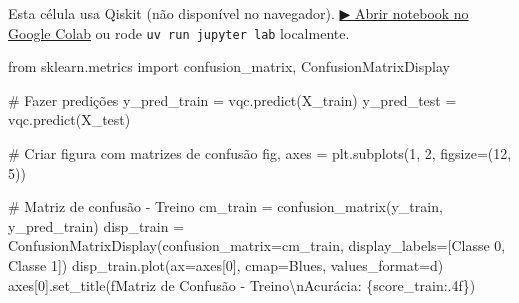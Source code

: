 \documentclass[
  brazilian,
]{report}
\newenvironment{Shaded}{\begin{snugshade}}{\end{snugshade}}
\newcommand{\CharTok}[1]{\textcolor[rgb]{0.13,0.47,0.30}{#1}}
\newcommand{\CommentTok}[1]{\textcolor[rgb]{0.37,0.37,0.37}{#1}}
\newcommand{\DecValTok}[1]{\textcolor[rgb]{0.68,0.00,0.00}{#1}}
\newcommand{\ImportTok}[1]{\textcolor[rgb]{0.00,0.46,0.62}{#1}}
\newcommand{\NormalTok}[1]{\textcolor[rgb]{0.00,0.23,0.31}{#1}}
\newcommand{\OperatorTok}[1]{\textcolor[rgb]{0.37,0.37,0.37}{#1}}
\newcommand{\SpecialCharTok}[1]{\textcolor[rgb]{0.37,0.37,0.37}{#1}}
\newcommand{\SpecialStringTok}[1]{\textcolor[rgb]{0.13,0.47,0.30}{#1}}
\newcommand{\StringTok}[1]{\textcolor[rgb]{0.13,0.47,0.30}{#1}}
\begin{document}
\begin{tcolorbox}[enhanced jigsaw, arc=.35mm, bottomrule=.15mm, bottomtitle=1mm, breakable, colback=white, colbacktitle=quarto-callout-warning-color!10!white, colframe=quarto-callout-warning-color-frame, coltitle=black, left=2mm, leftrule=.75mm, opacityback=0, opacitybacktitle=0.6, rightrule=.15mm, title=\textcolor{quarto-callout-warning-color}{\faExclamationTriangle}\hspace{0.5em}{⚛️ Célula Qiskit --- execute no Colab ou localmente}, titlerule=0mm, toprule=.15mm, toptitle=1mm]

Esta célula usa Qiskit (não disponível no navegador).
\href{https://colab.research.google.com/github/maxwellamaral/aula-quantum/blob/main/notebooks/20-quantum-machine-learning.ipynb}{▶
Abrir notebook no Google Colab} ou rode \texttt{uv\ run\ jupyter\ lab}
localmente.

\begin{Shaded}
\begin{Highlighting}[]

\ImportTok{from}\NormalTok{ sklearn.metrics }\ImportTok{import}\NormalTok{ confusion\_matrix, ConfusionMatrixDisplay}

\CommentTok{\# Fazer predições}
\NormalTok{y\_pred\_train }\OperatorTok{=}\NormalTok{ vqc.predict(X\_train)}
\NormalTok{y\_pred\_test }\OperatorTok{=}\NormalTok{ vqc.predict(X\_test)}

\CommentTok{\# Criar figura com matrizes de confusão}
\NormalTok{fig, axes }\OperatorTok{=}\NormalTok{ plt.subplots(}\DecValTok{1}\NormalTok{, }\DecValTok{2}\NormalTok{, figsize}\OperatorTok{=}\NormalTok{(}\DecValTok{12}\NormalTok{, }\DecValTok{5}\NormalTok{))}

\CommentTok{\# Matriz de confusão {-} Treino}
\NormalTok{cm\_train }\OperatorTok{=}\NormalTok{ confusion\_matrix(y\_train, y\_pred\_train)}
\NormalTok{disp\_train }\OperatorTok{=}\NormalTok{ ConfusionMatrixDisplay(confusion\_matrix}\OperatorTok{=}\NormalTok{cm\_train, display\_labels}\OperatorTok{=}\NormalTok{[}\StringTok{\textquotesingle{}Classe 0\textquotesingle{}}\NormalTok{, }\StringTok{\textquotesingle{}Classe 1\textquotesingle{}}\NormalTok{])}
\NormalTok{disp\_train.plot(ax}\OperatorTok{=}\NormalTok{axes[}\DecValTok{0}\NormalTok{], cmap}\OperatorTok{=}\StringTok{\textquotesingle{}Blues\textquotesingle{}}\NormalTok{, values\_format}\OperatorTok{=}\StringTok{\textquotesingle{}d\textquotesingle{}}\NormalTok{)}
\NormalTok{axes[}\DecValTok{0}\NormalTok{].set\_title(}\SpecialStringTok{f\textquotesingle{}Matriz de Confusão {-} Treino}\CharTok{\textbackslash{}n}\SpecialStringTok{Acurácia: }\SpecialCharTok{\{}\NormalTok{score\_train}\SpecialCharTok{:.4f\}}\SpecialStringTok{\textquotesingle{}}\NormalTok{)}


\end{Highlighting}
\end{Shaded}
\end{tcolorbox}
\end{document}
